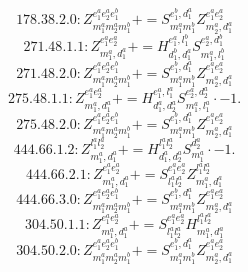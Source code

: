 \documentclass[letterpaper,10pt,fleqn,leqno,onecolumn]{article}
\begin{document}
\begin{equation} \;\;\;\;\;\;  178.38.2.0: Z^{e_{1}^{a}e_{2}^{a}e_{1}^{b}}_{m_{1}^{a}m_{2}^{a}m_{1}^{b}}+=S^{e_{1}^{b},d_{1}^{a}}_{m_{1}^{a}m_{1}^{b}}Z^{e_{1}^{a}e_{2}^{a}}_{m_{2}^{a},d_{1}^{a}} \end{equation}
\begin{equation} \;\;\;\;\;\;  271.48.1.1: Z^{e_{1}^{a}e_{2}^{a}}_{m_{1}^{a},d_{1}^{a}}+=H^{e_{1}^{a},l_{1}^{b}}_{d_{1}^{b},d_{1}^{a}}S^{e_{2}^{a},d_{1}^{b}}_{m_{1}^{a},l_{1}^{b}} \end{equation}
\begin{equation} \;\;\;\;\;\;  271.48.2.0: Z^{e_{1}^{a}e_{2}^{a}e_{1}^{b}}_{m_{1}^{a}m_{2}^{a}m_{1}^{b}}+=S^{e_{1}^{b},d_{1}^{a}}_{m_{1}^{a}m_{1}^{b}}Z^{e_{1}^{a}e_{2}^{a}}_{m_{2}^{a},d_{1}^{a}} \end{equation}
\begin{equation} \;\;\;\;\;\;  275.48.1.1: Z^{e_{1}^{a}e_{2}^{a}}_{m_{1}^{a},d_{1}^{a}}+=H^{e_{1}^{a},l_{1}^{a}}_{d_{1}^{a},d_{2}^{a}}S^{e_{2}^{a},d_{2}^{a}}_{m_{1}^{a},l_{1}^{a}}\cdot -1. \end{equation}
\begin{equation} \;\;\;\;\;\;  275.48.2.0: Z^{e_{1}^{a}e_{2}^{a}e_{1}^{b}}_{m_{1}^{a}m_{2}^{a}m_{1}^{b}}+=S^{e_{1}^{b},d_{1}^{a}}_{m_{1}^{a}m_{1}^{b}}Z^{e_{1}^{a}e_{2}^{a}}_{m_{2}^{a},d_{1}^{a}} \end{equation}
\begin{equation} \;\;\;\;\;\;  444.66.1.2: Z^{l_{1}^{a}l_{2}^{a}}_{m_{1}^{a},d_{1}^{a}}+=H^{l_{1}^{a}l_{2}^{a}}_{d_{1}^{a},d_{2}^{a}}S^{d_{2}^{a}}_{m_{1}^{a}}\cdot -1. \end{equation}
\begin{equation} \;\;\;\;\;\;  444.66.2.1: Z^{e_{1}^{a}e_{2}^{a}}_{m_{1}^{a},d_{1}^{a}}+=S^{e_{1}^{a}e_{2}^{a}}_{l_{1}^{a}l_{2}^{a}}Z^{l_{1}^{a}l_{2}^{a}}_{m_{1}^{a},d_{1}^{a}} \end{equation}
\begin{equation} \;\;\;\;\;\;  444.66.3.0: Z^{e_{1}^{a}e_{2}^{a}e_{1}^{b}}_{m_{1}^{a}m_{2}^{a}m_{1}^{b}}+=S^{e_{1}^{b},d_{1}^{a}}_{m_{1}^{a}m_{1}^{b}}Z^{e_{1}^{a}e_{2}^{a}}_{m_{2}^{a},d_{1}^{a}} \end{equation}
\begin{equation} \;\;\;\;\;\;  304.50.1.1: Z^{e_{1}^{a}e_{2}^{a}}_{m_{1}^{a},d_{1}^{a}}+=S^{e_{1}^{a}e_{2}^{a}}_{l_{1}^{a}l_{2}^{a}}H^{l_{1}^{a}l_{2}^{a}}_{m_{1}^{a},d_{1}^{a}} \end{equation}
\begin{equation} \;\;\;\;\;\;  304.50.2.0: Z^{e_{1}^{a}e_{2}^{a}e_{1}^{b}}_{m_{1}^{a}m_{2}^{a}m_{1}^{b}}+=S^{e_{1}^{b},d_{1}^{a}}_{m_{1}^{a}m_{1}^{b}}Z^{e_{1}^{a}e_{2}^{a}}_{m_{2}^{a},d_{1}^{a}} \end{equation}
\end{document}
